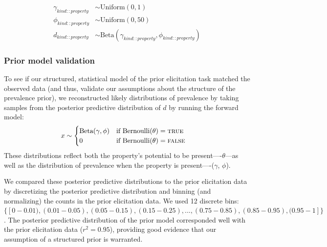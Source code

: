 \documentclass[10pt,letterpaper]{article}
\begin{document}
\begin{align*}
\gamma_{kind::property} & \sim \text{Uniform}(0, 1) \\
\phi_{kind::property} & \sim \text{Uniform}(0, 50) \\
d_{kind::property} & \sim \text{Beta}(\gamma_{kind::property}, \phi_{kind::property}) 
\end{align*}





\subsubsection{Prior model validation}

To see if our structured, statistical model of the prior elicitation task matched the observed data  (and thus, validate our assumptions about the structure of the prevalence prior), we reconstructed likely distributions of prevalence by taking samples from the posterior predictive distribution of $d$ by running the forward model: 
%
\begin{align*}
x & \sim \begin{cases} 
		\text{Beta}(\gamma, \phi) &\mbox{if } \text{Bernoulli}(\theta) = \textsc{true} \\
				0 &\mbox{if } \text{Bernoulli}(\theta) = \textsc{false}
				\end{cases} 
\end{align*}
%
These distributions reflect both the property's potential to be present----$\theta$---as well as the distribution of prevalence when the property is present----($\gamma$, $\phi$).

We compared these posterior predictive distributions to the prior elicitation data by discretizing the posterior predictive distribution and binning (and normalizing) the counts in the prior elicitation data.
We used 12 discrete bins: $\{[0-0.01), (0.01-0.05), (0.05-0.15), (0.15-0.25),  ..., (0.75-0.85), (0.85-0.95), (0.95-1]\}$.
The posterior predictive distribution of the prior model corresponded well with the prior elicitation data ($r^2=0.95$), providing good evidence that our assumption of a structured prior is warranted.
\end{document}
